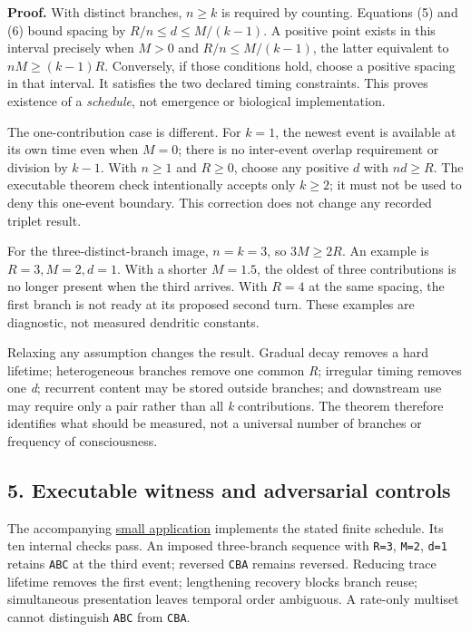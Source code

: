 \documentclass[
  american,
  11pt,
  letterpaper,
]{article}
\begin{document}
\textbf{Proof.} With distinct branches, \(n\geq k\) is required by counting. Equations (5) and (6) bound spacing by \(R/n\leq d\leq M/(k-1)\). A positive point exists in this interval precisely when \(M>0\) and \(R/n\leq M/(k-1)\), the latter equivalent to \(nM\geq(k-1)R\). Conversely, if those conditions hold, choose a positive spacing in that interval. It satisfies the two declared timing constraints. This proves existence of a \emph{schedule}, not emergence or biological implementation.

The one-contribution case is different. For \(k=1\), the newest event is available at its own time even when \(M=0\); there is no inter-event overlap requirement or division by \(k-1\). With \(n\geq1\) and \(R\geq0\), choose any positive \(d\) with \(nd\geq R\). The executable theorem check intentionally accepts only \(k\geq2\); it must not be used to deny this one-event boundary. This correction does not change any recorded triplet result.

For the three-distinct-branch image, \(n=k=3\), so \(3M\geq2R\). An example is \(R=3,M=2,d=1\). With a shorter \(M=1.5\), the oldest of three contributions is no longer present when the third arrives. With \(R=4\) at the same spacing, the first branch is not ready at its proposed second turn. These examples are diagnostic, not measured dendritic constants.

Relaxing any assumption changes the result. Gradual decay removes a hard lifetime; heterogeneous branches remove one common \emph{R}; irregular timing removes one \emph{d}; recurrent content may be stored outside branches; and downstream use may require only a pair rather than all \emph{k} contributions. The theorem therefore identifies what should be measured, not a universal number of branches or frequency of consciousness.

\subsection{5. Executable witness and adversarial controls}\label{executable-witness-and-adversarial-controls}

The accompanying \href{https://github.com/v5ma/v5ma.github.io/blob/f6d3867df89ae9dea32f763b1d55c84212c41cc6/papers/companions/five-papers-20260923/temporal/paper/applications/temporal-ensemble-v01/model.py}{small application} implements the stated finite schedule. Its ten internal checks pass. An imposed three-branch sequence with \texttt{R=3}, \texttt{M=2}, \texttt{d=1} retains \texttt{ABC} at the third event; reversed \texttt{CBA} remains reversed. Reducing trace lifetime removes the first event; lengthening recovery blocks branch reuse; simultaneous presentation leaves temporal order ambiguous. A rate-only multiset cannot distinguish \texttt{ABC} from \texttt{CBA}.
\end{document}
